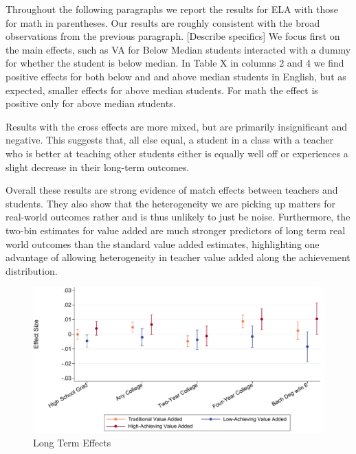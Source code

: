 \documentclass{article}
\theoremstyle{definition}
\theoremstyle{definition}
\theoremstyle{definition}
\theoremstyle{definition}
\begin{document}
Throughout the following paragraphs we report the results for ELA with those for math in parentheses. Our results are roughly consistent with the broad observations from the previous paragraph. 
 [Describe specifics]
We focus first on the main effects, such as VA for Below Median students interacted with a dummy for whether the student is below median. In Table X in columns 2 and 4 we find positive effects for both below and and above median students in English, but as expected, smaller effects for above median students. For math the effect is positive only for above median students.

Results with the cross effects are more mixed, but are primarily insignificant and negative. This suggests that, all else equal, a student in a class with a teacher who is better at teaching other students either is equally well off or experiences a slight decrease in their long-term outcomes.

Overall these results are strong evidence of match effects between teachers and students. They also show that the heterogeneity we are picking up matters for real-world outcomes rather and is thus unlikely to just be noise. Furthermore, the two-bin estimates for value added are much stronger predictors of long term real world outcomes than the standard value added estimates, highlighting one advantage of allowing heterogeneity in teacher value added along the achievement distribution.


\begin{figure}
\label{long_term_coefs}
\begin{center}


\includegraphics[width=.95\textwidth]{Working_Paper/WP_Figures/fig2b_longterm.pdf}
\end{center}
    \caption{Long Term Effects}
    \label{fig:my_label}
\end{figure}
\end{document}
